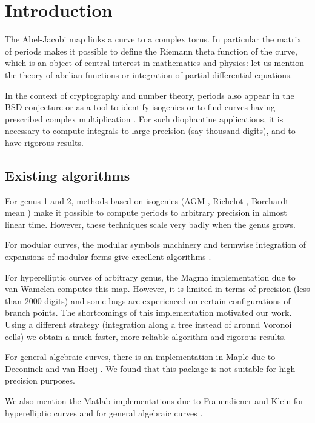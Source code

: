 \documentclass[main.tex]{subfiles}
\begin{document}
  \section{Introduction}

  The Abel-Jacobi map links a curve to a complex torus.
  In particular the matrix of periods makes it possible to define the Riemann
  theta function of the curve, which is an object of central interest in
  mathematics and physics: let us
  mention the theory of abelian functions or integration of partial differential
  equations.

  In the context of cryptography and number theory, periods also appear
  in the BSD conjecture or as a tool to identify isogenies or to find
  curves having prescribed complex multiplication \cite{vanWamelen06}.
  For such diophantine applications, it is necessary to compute
  integrals to large precision (say thousand digits), and to have
  rigorous results.

  \subsection{Existing algorithms}

  For genus 1 and 2, methods based on isogenies (AGM \cite{CremonaAGM13},
  Richelot \cite{BostMestre88}, Borchardt mean \cite{Labrande16})
  make it possible to compute periods to arbitrary precision in almost
  linear time. However, these techniques scale very badly when the genus grows.

  For modular curves, the modular symbols machinery and termwise integration of
  expansions of modular forms give excellent algorithms
  \cite[\S 3.2]{Mascot13}.

  For hyperelliptic curves of arbitrary genus, the Magma implementation
  due to van Wamelen \cite{vanWamelen06} computes this map.
  However, it is limited in terms of precision (less
  than 2000 digits) and some bugs are experienced on
  certain configurations of branch points. The shortcomings of this implementation motivated our
  work. Using a different strategy
  (integration along a tree instead of around Voronoi cells)
  we obtain a much faster, more reliable algorithm and rigorous results.

  For general algebraic curves, there is an implementation in Maple
  due to Deconinck and van Hoeij \cite{DeconinckvanHoeij01}.
  We found that this package is not suitable for high precision purposes.

  We also mention the Matlab implementations due to Frauendiener and Klein for hyperelliptic curves \cite{FrauendienerKlein2015} 
  and for general algebraic curves \cite{FrauendienerKlein2011}. 
  
\end{document}
